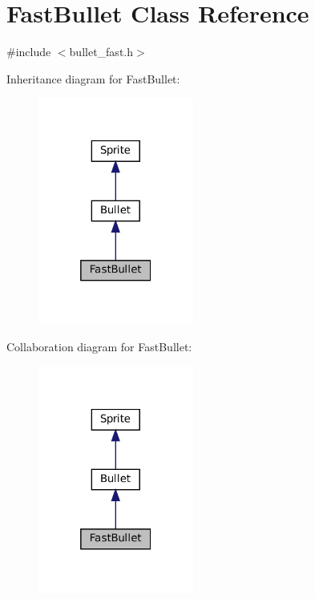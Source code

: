 \hypertarget{classFastBullet}{}\section{Fast\+Bullet Class Reference}
\label{classFastBullet}


{\ttfamily \#include $<$bullet\+\_\+fast.\+h$>$}



Inheritance diagram for Fast\+Bullet\+:
\nopagebreak
\begin{figure}[H]
\begin{center}
\leavevmode
\includegraphics[width=145pt]{classFastBullet__inherit__graph}
\end{center}
\end{figure}


Collaboration diagram for Fast\+Bullet\+:
\nopagebreak
\begin{figure}[H]
\begin{center}
\leavevmode
\includegraphics[width=145pt]{classFastBullet__coll__graph}
\end{center}
\end{figure}
